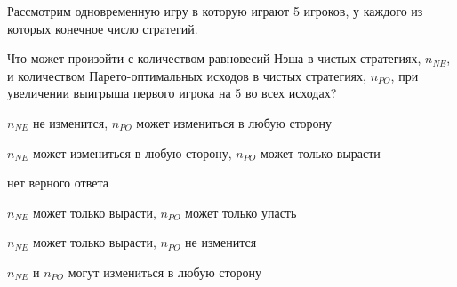 
\begin{question}
Рассмотрим одновременную игру в которую играют 5 игроков, у каждого из которых конечное число стратегий.

Что может произойти с количеством равновесий Нэша в чистых стратегиях, \(n_{NE}\), и количеством Парето-оптимальных исходов в чистых стратегиях, \(n_{PO}\),
при увеличении выигрыша первого игрока на 5 во всех исходах?
\begin{answerlist}
  \item \(n_{NE}\) не изменится, \(n_{PO}\) может измениться в любую сторону
  \item \(n_{NE}\) может измениться в любую сторону, \(n_{PO}\) может только вырасти
  \item нет верного ответа
  \item \(n_{NE}\) может только вырасти, \(n_{PO}\) может только упасть
  \item \(n_{NE}\) может только вырасти, \(n_{PO}\) не изменится
  \item \(n_{NE}\) и \(n_{PO}\) могут измениться в любую сторону
\end{answerlist}
\end{question}


